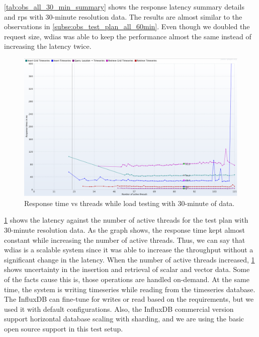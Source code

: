 \cref{tab:obs_all_30_min_summary} shows the response latency summary details and \acrshort{rps} with 30-minute resolution data. The results are almost similar to the observations in \cref{subse:obs_test_plan_all_60min}. Even though we doubled the request size, \acrshort{wdias} was able to keep the performance almost the same instead of increasing the latency twice.

\begin{figure}[htp]
    \centering
    \includegraphics[width=1.0\textwidth]{results/obs/all/obs_all_30m_response_times_vs_threads.png}
    \caption{Response time vs threads while load testing with 30-minute of data.}
    \label{fi:test_obs_all_30m_response_vs_threads}
\end{figure}

\cref{fi:test_obs_all_30m_response_vs_threads} shows the latency against the number of active threads for the test plan with 30-minute resolution data. As the graph shows, the response time kept almost constant while increasing the number of active threads. Thus, we can say that \acrshort{wdias} is a scalable system since it was able to increase the throughput without a significant change in the latency. When the number of active threads increased, \cref{fi:test_obs_all_30m_response_vs_threads} shows uncertainty in the insertion and retrieval of scalar and vector data. Some of the facts cause this is, those operations are handled on-demand. At the same time, the system is writing timeseries while reading from the timeseries database. The InfluxDB can fine-tune for writes or read based on the requirements, but we used it with default configurations. Also, the InfluxDB commercial version support horizontal database scaling with sharding, and we are using the basic open source support in this test setup.

